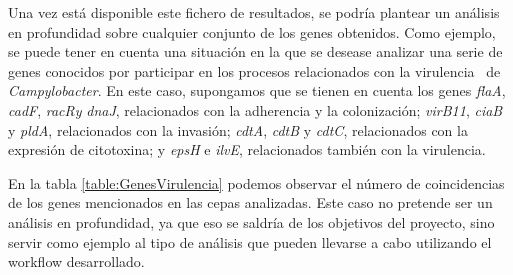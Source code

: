 Una vez está disponible este fichero de resultados, se podría plantear un análisis en profundidad sobre cualquier conjunto de los genes obtenidos. Como ejemplo, se puede tener en cuenta una situación en la que se desease analizar una serie de genes conocidos por participar en los procesos relacionados con la virulencia~\cite{garciasanchez2017} de \textit{Campylobacter}. En este caso, supongamos que se tienen en cuenta los genes \textit{flaA}, \textit{cadF}, \textit{racRy} \textit{dnaJ}, relacionados con la adherencia y la colonización; \textit{virB11}, \textit{ciaB} y \textit{pldA}, relacionados con la invasión; \textit{cdtA}, \textit{cdtB} y \textit{cdtC}, relacionados con la expresión de citotoxina; y \textit{epsH} e \textit{ilvE}, relacionados también con la virulencia. 

En la tabla \ref{table:GenesVirulencia} podemos observar el número de coincidencias de los genes mencionados en las cepas analizadas. Este caso no pretende ser un análisis en profundidad, ya que eso se saldría de los objetivos del proyecto, sino servir como ejemplo al tipo de análisis que pueden llevarse a cabo utilizando el workflow desarrollado.

